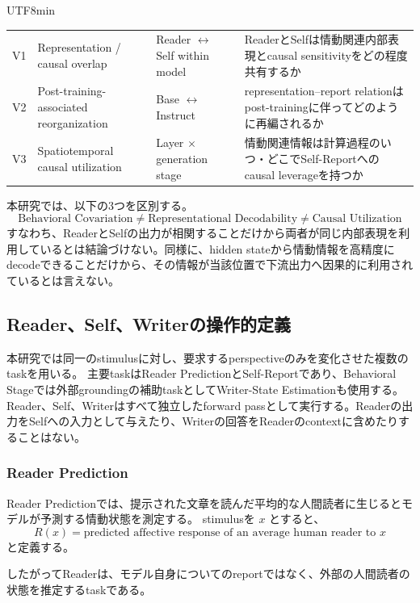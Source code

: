 \documentclass{article} %
\begin{document}
\begin{CJK*}{UTF8}{min}
\begin{table}[htbp]
\begin{tabularx}{\linewidth}{
@{}
>{\raggedright\arraybackslash}p{1.4cm}
>{\raggedright\arraybackslash}p{2.4cm}
>{\raggedright\arraybackslash}p{2.7cm}
>{\raggedright\arraybackslash}X
@{}
}
V1 &
Representation / causal overlap &
Reader $\leftrightarrow$ Self within model &
ReaderとSelfは情動関連内部表現とcausal sensitivityをどの程度共有するか \\

V2 &
Post-training-associated reorganization &
Base $\leftrightarrow$ Instruct &
representation--report relationはpost-trainingに伴ってどのように再編されるか \\

V3 &
Spatiotemporal causal utilization &
Layer $\times$ generation stage &
情動関連情報は計算過程のいつ・どこでSelf-Reportへのcausal leverageを持つか \\
\bottomrule
\end{tabularx}
\end{table}

本研究では、以下の3つを区別する。
\[
\text{Behavioral Covariation}
\neq
\text{Representational Decodability}
\neq
\text{Causal Utilization}
\]
すなわち、ReaderとSelfの出力が相関することだけから両者が同じ内部表現を利用しているとは結論づけない。同様に、hidden stateから情動情報を高精度にdecodeできることだけから、その情報が当該位置で下流出力へ因果的に利用されているとは言えない。


\subsection{Reader、Self、Writerの操作的定義}
\label{app:task_definitions}

本研究では同一のstimulusに対し、要求するperspectiveのみを変化させた複数のtaskを用いる。
主要taskはReader PredictionとSelf-Reportであり、Behavioral Stageでは外部groundingの補助taskとしてWriter-State Estimationも使用する。
Reader、Self、Writerはすべて独立したforward passとして実行する。Readerの出力をSelfへの入力として与えたり、Writerの回答をReaderのcontextに含めたりすることはない。

\subsubsection{Reader Prediction}

Reader Predictionでは、提示された文章を読んだ平均的な人間読者に生じるとモデルが予測する情動状態を測定する。
stimulusを \(x\) とすると、
\[
R(x)
=
\text{predicted affective response of an average human reader to }x
\]
と定義する。

したがってReaderは、モデル自身についてのreportではなく、外部の人間読者の状態を推定するtaskである。


\end{CJK*}
\end{document}
